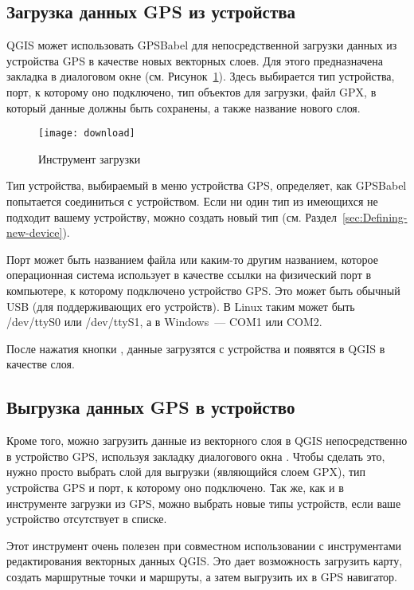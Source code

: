 \subsection{Загрузка данных GPS из устройства}

QGIS может использовать GPSBabel для непосредственной загрузки данных из
устройства GPS в качестве новых векторных слоев. Для этого предназначена
закладка  в диалоговом окне 
(см. Рисунок~\ref{figure_download}). Здесь выбирается тип устройства,
порт, к которому оно подключено, тип объектов для загрузки, файл GPX, в
который данные должны быть сохранены, а также название нового слоя.

\begin{figure}[ht]
   \centering
   \texttt{[image: download]}
   \caption{Инструмент загрузки \wincaption}\label{figure_download}
\end{figure}

Тип устройства, выбираемый в меню устройства GPS, определяет, как
GPSBabel попытается соединиться с устройством. Если ни один тип из
имеющихся не подходит вашему устройству, можно создать новый тип
(см. Раздел~\ref{sec:Defining-new-device}).

Порт может быть названием файла или каким-то другим названием, которое
операционная система использует в качестве ссылки на физический порт в
компьютере, к которому подключено устройство GPS. Это может быть
обычный USB (для поддерживающих его устройств).
\nix В Linux таким может быть /dev/ttyS0 или /dev/ttyS1, а в
\win Windows~--- COM1 или COM2.

После нажатия кнопки , данные загрузятся с устройства и
появятся в QGIS в качестве слоя.

\subsection{Выгрузка данных GPS в устройство}

Кроме того, можно загрузить данные из векторного слоя в QGIS
непосредственно в устройство GPS, используя закладку 
диалогового окна . Чтобы сделать это, нужно просто
выбрать слой для выгрузки (являющийся слоем GPX), тип устройства GPS и
порт, к которому оно подключено. Так же, как и в инструменте загрузки
из GPS, можно выбрать новые типы устройств, если ваше устройство
отсутствует в списке.

Этот инструмент очень полезен при совместном использовании с
инструментами редактирования векторных данных QGIS. Это дает возможность
загрузить карту, создать маршрутные точки и маршруты, а затем выгрузить
их в GPS навигатор.

